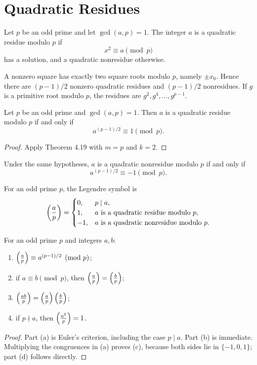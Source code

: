 \chapter{Quadratic Residues}

\begin{de}
Let $p$ be an odd prime and let $\gcd(a,p)=1$.  The integer $a$ is a quadratic residue modulo $p$ if
\[
 x^2\equiv a\pmod p
\]
has a solution, and a quadratic nonresidue otherwise.
\end{de}
\begin{remark}
A nonzero square has exactly two square roots modulo $p$, namely $\pm x_0$.  Hence there are $(p-1)/2$ nonzero quadratic residues and $(p-1)/2$ nonresidues.  If $g$ is a primitive root modulo $p$, the residues are
$g^2,g^4,\ldots,g^{p-1}$.
\end{remark}

\begin{thm}
Let $p$ be an odd prime and $\gcd(a,p)=1$.  Then $a$ is a quadratic residue modulo $p$ if and only if
\[
 a^{(p-1)/2}\equiv1\pmod p.
\]
\end{thm}
\begin{proof}
Apply Theorem 4.19 with $m=p$ and $k=2$.
\end{proof}

\begin{cor}
Under the same hypotheses, $a$ is a quadratic nonresidue modulo $p$ if and only if
\[
 a^{(p-1)/2}\equiv-1\pmod p.
\]
\end{cor}

\begin{de}
For an odd prime $p$, the Legendre symbol is
\[
 \left(\frac{a}{p}\right)=
 \begin{cases}
 0,&p\mid a,\\
 1,&a\text{ is a quadratic residue modulo }p,\\
 -1,&a\text{ is a quadratic nonresidue modulo }p.
 \end{cases}
\]
\end{de}

\begin{thm}
For an odd prime $p$ and integers $a,b$:
\begin{enumerate}[label=(\alph*)]
\item $\left(\frac{a}{p}\right)\equiv a^{(p-1)/2}\pmod p$;
\item if $a\equiv b\pmod p$, then $\left(\frac{a}{p}\right)=\left(\frac{b}{p}\right)$;
\item $\left(\frac{ab}{p}\right)=\left(\frac{a}{p}\right)\left(\frac{b}{p}\right)$;
\item if $p\nmid a$, then $\left(\frac{a^2}{p}\right)=1$.
\end{enumerate}
\end{thm}
\begin{proof}
Part (a) is Euler's criterion, including the case $p\mid a$.  Part (b) is immediate.  Multiplying the congruences in (a) proves (c), because both sides lie in $\{-1,0,1\}$; part (d) follows directly.
\end{proof}

